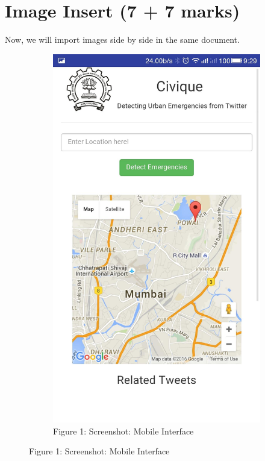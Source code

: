 \documentclass[english,12pt]{article}
\begin{document}
\section{Image Insert (7 + 7 marks)}
\centerline{Now, we will import images side by side in the same document.}
\begin{figure}[H]
  \centering
  \begin{subfigure}[t]{0.4\textwidth}
    \includegraphics[width=\textwidth]{1}
    \caption*{\normalsize Figure 1: Screenshot: Mobile Interface}

\end{subfigure}
\end{figure}
\end{document}

